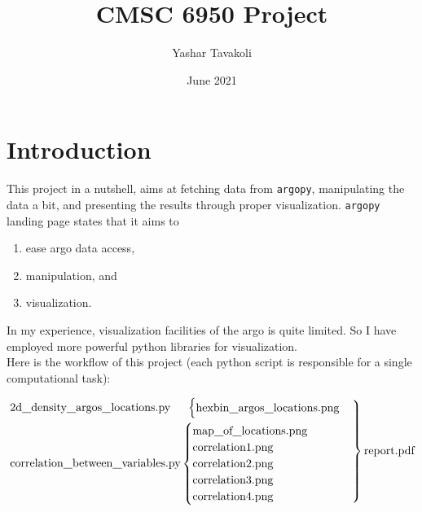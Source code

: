 \documentclass[12pt]{article}
\title{CMSC 6950 Project}
\date{June 2021}
\author{Yashar Tavakoli}
\begin{document}
\maketitle
\section{Introduction}

This project in a nutshell, aims at fetching data from \verb|argopy|, manipulating the data a bit, and presenting the results
through proper visualization. \verb|argopy| landing page states that it aims to 
\begin{enumerate}
    \item ease argo data access, 
    \item manipulation, and
    \item visualization. 
\end{enumerate} 
In my experience, visualization facilities of the argo is quite limited. So I have employed more powerful python
libraries for visualization. \\

Here is the workflow of this project (each python script is responsible for a single computational task):

\begin{equation*}
    \begin{rcases}
    \text{2d\underline{\hspace{8pt}}density\underline{\hspace{8pt}}argos\underline{\hspace{8pt}}locations.py}\hspace{14pt}\begin{cases}
      \text{hexbin\underline{\hspace{8pt}}argos\underline{\hspace{8pt}}locations.png}
    \end{cases}
    \\
    \text{correlation\underline{\hspace{8pt}}between\underline{\hspace{8pt}}variables.py}\begin{cases}
        \text{map\underline{\hspace{8pt}}of\underline{\hspace{8pt}}locations.png}\\
        \text{correlation1.png}\\
        \text{correlation2.png}\\
        \text{correlation3.png}\\
        \text{correlation4.png}
    \end{cases}
    \end{rcases}
    \text{report.pdf}
\end{equation*}
\end{document}
